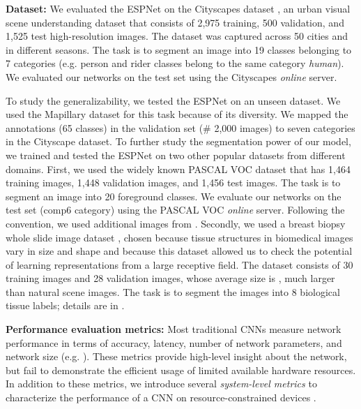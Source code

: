 \documentclass[runningheads]{llncs}
\begin{document}
\noindent \textbf{Dataset:} We evaluated the ESPNet on the Cityscapes dataset \cite{cordts2016cityscapes}, an urban visual scene understanding dataset that consists of 2,975 training, 500 validation, and 1,525 test high-resolution images. The dataset was captured across 50 cities and in different seasons. The task is to segment an image into 19 classes belonging to 7 categories (e.g. person and rider classes belong to the same category \textit{human}). We evaluated our networks on the test set using the Cityscapes \textit{online} server.

To study the generalizability, we tested the ESPNet on an unseen dataset. We used the Mapillary dataset \cite{MVD2017} for this task because of its diversity. We mapped the annotations (65 classes) in the validation set (\# 2,000 images) to seven categories in the Cityscape dataset.
To further study the segmentation power of our model, we trained and tested the ESPNet on two other popular datasets from different domains. First, we used the widely known PASCAL VOC dataset \cite{everingham2010pascal} that has 1,464 training images, 1,448 validation images, and 1,456 test images. The task is to segment an image into 20 foreground classes. We evaluate our networks on the test set (comp6 category) using the PASCAL VOC \textit{online} server. Following the convention, we used additional images from \cite{hariharan2011semantic,lin2014microsoft}. Secondly, we used a breast biopsy whole slide image dataset \cite{mehta2017learning}, chosen because tissue structures in biomedical images vary in size and shape and because this dataset allowed us to check the potential of learning representations from a large receptive field. The dataset consists of 30 training images and 28 validation images, whose average size is , much larger than natural scene images. The task is to segment the images into 8 biological tissue labels; details are in \cite{mehta2017learning}.


\noindent \textbf{Performance evaluation metrics:} Most traditional CNNs measure network performance in terms of accuracy, latency, number of network parameters, and network size (e.g. \cite{howard2017mobilenets,zhang2017shufflenet,paszke2016enet,romera2018erfnet,iandola2016squeezenet}). These metrics provide high-level insight about the network, but fail to demonstrate the efficient usage of limited available hardware resources. In addition to these metrics, we introduce several \textit{system-level metrics} to characterize the performance of a CNN on resource-constrained devices \cite{yasin2014deep,wu2015performance}.
\end{document}
